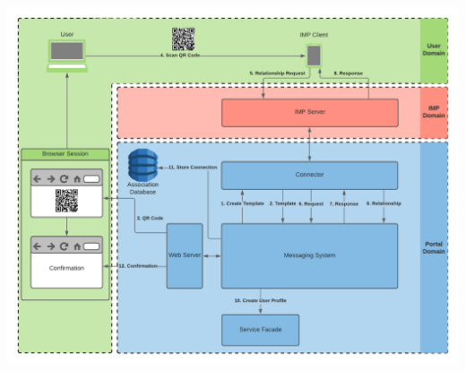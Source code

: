 \begin{center}
    \includegraphics[scale=0.6]{Diagrams/Integration Architecture 1/Technological Integration/5. Onboarding Overview.pdf}
\end{center}

